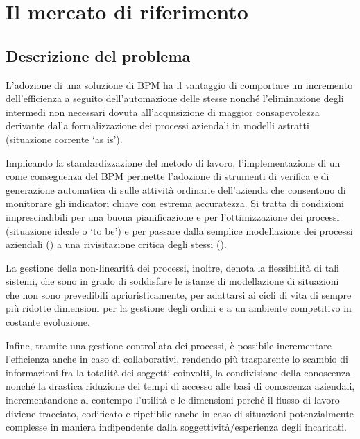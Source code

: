 \section{Il mercato di riferimento}\label{sec:whattheproblemis}

\subsection{Descrizione del problema}

L'adozione di una soluzione di BPM ha il vantaggio di comportare un incremento dell'efficienza a seguito dell'automazione delle stesse nonché l'eliminazione degli  intermedi non necessari dovuta all'acquisizione di maggior consapevolezza derivante dalla formalizzazione dei processi aziendali in modelli astratti (situazione corrente `as is').

Implicando la standardizzazione del metodo di lavoro, l'implementazione di un  come conseguenza del BPM permette l'adozione di strumenti di verifica e di generazione automatica di  sulle attività ordinarie dell'azienda che consentono di monitorare gli indicatori chiave con estrema accuratezza. Si tratta di condizioni imprescindibili per una buona pianificazione e per l'ottimizzazione dei processi (situazione ideale o `to be') e per passare dalla semplice modellazione dei processi aziendali (\bsn {}) a una rivisitazione critica degli stessi (\bsn {}).

La gestione della non-linearità dei processi, inoltre, denota la flessibilità di tali sistemi, che sono in grado di soddisfare le istanze di modellazione di situazioni che non sono prevedibili aprioristicamente, per adattarsi ai cicli di vita di sempre più ridotte dimensioni per la gestione degli ordini e a un ambiente competitivo in costante evoluzione.

Infine, tramite una gestione controllata dei processi, è possibile incrementare l'efficienza anche in caso di  collaborativi, rendendo più trasparente lo scambio di informazioni fra la totalità dei soggetti coinvolti, la condivisione della conoscenza nonché la drastica riduzione dei tempi di accesso alle basi di conoscenza aziendali, incrementandone al contempo l'utilità e le dimensioni perché il flusso di lavoro diviene tracciato, codificato e ripetibile anche in caso di situazioni potenzialmente complesse in maniera indipendente dalla soggettività/esperienza degli incaricati.

